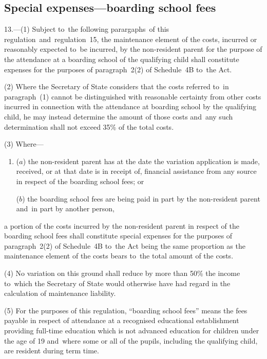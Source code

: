 \documentclass[12pt,a4paper]{article}
\begin{document}

\subsection[13. Special expenses—boarding school fees]{Special expenses—boarding school fees}

13.---(1)  Subject to~the following parargaphs~of this regulation~and~regulation~15, the maintenance element of the costs, incurred or reasonably expected to~be incurred, by the non-resident parent for the purpose of the attendance at a boarding school of the qualifying child shall constitute expenses for the purposes of paragraph~2(2) of Schedule~4B to~the Act.

(2) Where the Secretary of State considers that the costs referred to~in paragraph~(1) cannot be distinguished with reasonable certainty from other costs incurred in connection with the attendance at boarding school by the qualifying child, he may instead determine the amount of those costs and~any such determination shall not exceed 35\% of the total costs.

(3) Where—
\begin{enumerate}\item[]
($a$) the non-resident parent has at the date the variation application is made, received, or at that date is in receipt of, financial assistance from any source in respect of the boarding school fees; or

($b$) the boarding school fees are being paid in part by the non-resident parent and~in part by another person,
\end{enumerate}
a portion of the costs incurred by the non-resident parent in respect of the boarding school fees shall constitute special expenses for the purposes of paragraph~2(2) of Schedule~4B to~the Act being the same proportion as the maintenance element of the costs bears to~the total amount of the costs.

(4) No variation on this ground shall reduce by more than 50\% the income to~which the Secretary of State would otherwise have had regard in the calculation of maintenance liability.

(5) For the purposes of this regulation, “boarding school fees” means the fees payable in respect of attendance at a recognised educational establishment providing full-time education which is not advanced education for children under the age of 19 and~where some or all of the pupils, including the qualifying child, are resident during term time.
\end{document}
